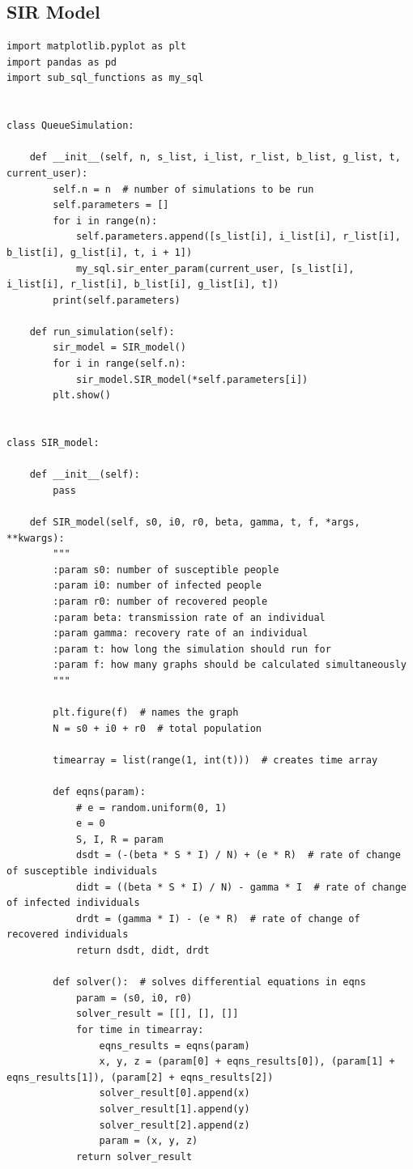 \documentclass[11pt, a4paper]{article}
\begin{document}
\subsection{SIR Model}
\begin{lstlisting}
import matplotlib.pyplot as plt
import pandas as pd
import sub_sql_functions as my_sql


class QueueSimulation:

    def __init__(self, n, s_list, i_list, r_list, b_list, g_list, t, current_user):
        self.n = n  # number of simulations to be run
        self.parameters = []
        for i in range(n):
            self.parameters.append([s_list[i], i_list[i], r_list[i], b_list[i], g_list[i], t, i + 1])
            my_sql.sir_enter_param(current_user, [s_list[i], i_list[i], r_list[i], b_list[i], g_list[i], t])
        print(self.parameters)

    def run_simulation(self):
        sir_model = SIR_model()
        for i in range(self.n):
            sir_model.SIR_model(*self.parameters[i])
        plt.show()


class SIR_model:

    def __init__(self):
        pass

    def SIR_model(self, s0, i0, r0, beta, gamma, t, f, *args, **kwargs):
        """
        :param s0: number of susceptible people
        :param i0: number of infected people
        :param r0: number of recovered people
        :param beta: transmission rate of an individual
        :param gamma: recovery rate of an individual
        :param t: how long the simulation should run for
        :param f: how many graphs should be calculated simultaneously
        """

        plt.figure(f)  # names the graph
        N = s0 + i0 + r0  # total population

        timearray = list(range(1, int(t)))  # creates time array

        def eqns(param):
            # e = random.uniform(0, 1)
            e = 0
            S, I, R = param
            dsdt = (-(beta * S * I) / N) + (e * R)  # rate of change of susceptible individuals
            didt = ((beta * S * I) / N) - gamma * I  # rate of change of infected individuals
            drdt = (gamma * I) - (e * R)  # rate of change of recovered individuals
            return dsdt, didt, drdt

        def solver():  # solves differential equations in eqns
            param = (s0, i0, r0)
            solver_result = [[], [], []]
            for time in timearray:
                eqns_results = eqns(param)
                x, y, z = (param[0] + eqns_results[0]), (param[1] + eqns_results[1]), (param[2] + eqns_results[2])
                solver_result[0].append(x)
                solver_result[1].append(y)
                solver_result[2].append(z)
                param = (x, y, z)
            return solver_result


\end{lstlisting}
\end{document}
